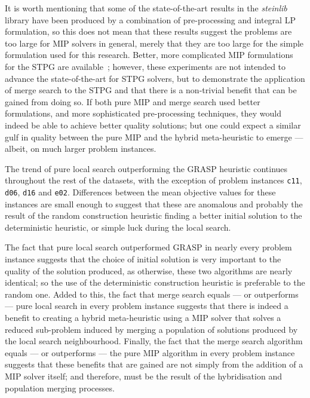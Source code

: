 \documentclass[journal]{IEEEtran}
\begin{document}
It is worth mentioning that some of the state-of-the-art results in the \emph{steinlib} library have been produced by a combination of pre-processing and integral LP formulation, so this does not mean that these results suggest the problems are too large for MIP solvers in general, merely that they are too large for the simple formulation used for this research. Better, more complicated MIP formulations for the STPG are available~\cite{goemans,stpg-improved,hypergraph}; however, these experiments are not intended to advance the state-of-the-art for STPG solvers, but to demonstrate the application of merge search to the STPG and that there is a non-trivial benefit that can be gained from doing so. If both pure MIP and merge search used better formulations, and more sophisticated pre-processing techniques, they would indeed be able to achieve better quality solutions; but one could expect a similar gulf in quality between the pure MIP and the hybrid meta-heuristic to emerge --- albeit, on much larger problem instances.

The trend of pure local search outperforming the GRASP heuristic continues throughout the rest of the datasets, with the exception of problem instances \texttt{c11}, \texttt{d06}, \texttt{d16} and \texttt{e02}. Differences between the mean objective values for these instances are small enough to suggest that these are anomalous and probably the result of the random construction heuristic finding a better initial solution to the deterministic heuristic, or simple luck during the local search. 

The fact that pure local search outperformed GRASP in nearly every problem instance suggests that the choice of initial solution is very important to the quality of the solution produced, as otherwise, these two algorithms are nearly identical; so the use of the deterministic construction heuristic is preferable to the random one. Added to this, the fact that merge search equals --- or outperforms --- pure local search in every problem instance suggests that there is indeed a benefit to creating a hybrid meta-heuristic using a MIP solver that solves a reduced sub-problem induced by merging a population of solutions produced by the local search neighbourhood. Finally, the fact that the merge search algorithm equals --- or outperforms --- the pure MIP algorithm in every problem instance suggests that these benefits that are gained are not simply from the addition of a MIP solver itself; and therefore, must be the result of the hybridisation and population merging processes.
\end{document}
